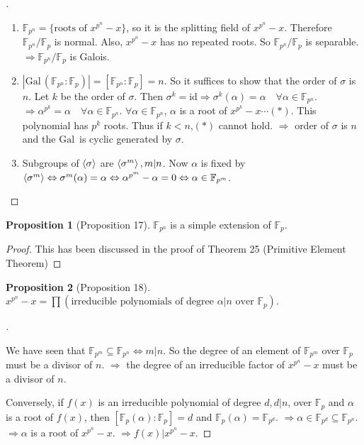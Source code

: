 \documentclass{article}
\theoremstyle{definition}
\newtheorem{prop}{Proposition}
\newenvironment{proofs}[1][\proofname]{%
  \begin{proof}[#1]$ $\par\nobreak\ignorespaces
}{%
  \end{proof}
}
\newcommand{\FF}{\mathbb F}
\newcommand{\Ra}{\Rightarrow}
\newcommand{\Lra}{\Leftrightarrow}
\newcommand{\Gal}{\text{Gal}\,}
\begin{document}
\begin{proofs}
	\begin{enumerate}
		\item[(1)] $\FF_{p^n} = \{\text{roots of }x^{p^n} - x\}$, so it is the splitting field of $x^{p^n} - x$.
			Therefore $\FF_{p^n}/\FF_p$ is normal.
			Also, $x^{p^n} - x$ has no repeated roots.
			So $\FF_{p^n} /\FF_p$ is separable.
			$\Ra \FF_{p^n}/\FF_p$ is Galois.

		\item[(2)] $|\Gal(\FF_{p^n}:\FF_p)| = [\FF_{p^n}:\FF_p] = n$.
			So it suffices to show that the order of $\sigma$ is $n$.
			Let $k$ be the order of $\sigma$.
			Then $\sigma^k = \text{id} \Ra \sigma^k(\alpha) = \alpha \quad \forall \alpha \in \FF_{p^n}$.
			$\Ra \alpha^{p^k} = \alpha \quad \forall \alpha \in \FF_{p^n}$.
			$\forall \alpha \in \FF_{p^n}$, $\alpha$ is a root of $x^{p^k} - x \cdots (*)$.
			This polynomial has $p^k$ roots.
			Thus if $k < n$,$(*)$ cannot hold.
			$\Ra$ order of $\sigma$ is $n$ and the $\Gal$ is cyclic generated by $\sigma$.

		\item[(3)] Subgroups of $\ev{\sigma}$ are $\ev{\sigma^m}, m | n$.
			Now $\alpha$ is fixed by $\ev{\sigma^m} \Lra \sigma^m(\alpha) = \alpha \Lra \alpha^{p^m} - \alpha = 0 \Lra \alpha \in \FF_{p^m}$.
	\end{enumerate}
\end{proofs}

\begin{prop}[Proposition 17]
	$\FF_{p^n}$ is a simple extension of $\FF_p$.
\end{prop}

\begin{proof}
	This has been discussed in the proof of Theorem 25 (Primitive Element Theorem)
\end{proof}

\begin{prop}[Proposition 18]
	$x^{p^n} - x = \prod (\text{irreducible polynomials of degree }\alpha | n \text{ over }\FF_p)$.
\end{prop}

\begin{proofs}
	We have seen that $\FF_{p^m} \subseteq \FF_{p^n} \Lra m | n$.
	So the degree of an element of $\FF_{p^m}$ over $\FF_p$ must be a divisor of $n$.
	$\Ra$ the degree of an irreducible factor of $x^{p^n} - x$ must be a divisor of $n$.

	\par Conversely, if $f(x)$ is an irreducible polynomial of degree $d, d|n$, over $\FF_p$ and $\alpha$ is a root of $f(x)$, then $[\FF_p(\alpha) : \FF_p] = d$ and $\FF_p(\alpha) = \FF_{p^d}$.
	$\Ra \alpha \in \FF_{p^d} \subseteq \FF_{p^n}$.
	$\Ra \alpha$ is a root of $x^{p^n} - x$.
	$\Ra f(x) | x^{p^n} - x$.
\end{proofs}
\end{document}
